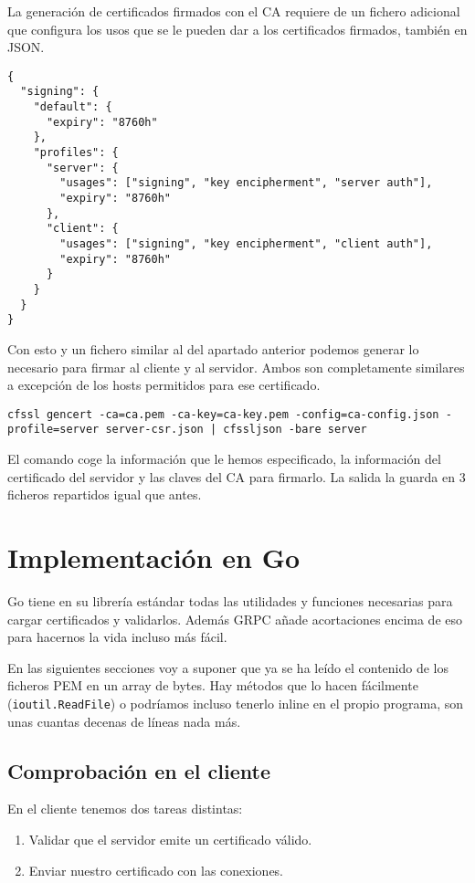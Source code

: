 La generación de certificados firmados con el CA requiere de un fichero adicional que configura los usos que se le pueden dar a los certificados firmados, también en JSON.

\begin{verbatim}
{
  "signing": {
    "default": {
      "expiry": "8760h"
    },
    "profiles": {
      "server": {
        "usages": ["signing", "key encipherment", "server auth"],
        "expiry": "8760h"
      },
      "client": {
        "usages": ["signing", "key encipherment", "client auth"],
        "expiry": "8760h"
      }
    }
  }
}
\end{verbatim}

Con esto y un fichero similar al del apartado anterior podemos generar lo necesario para firmar al cliente y al servidor. Ambos son completamente similares a excepción de los hosts permitidos para ese certificado.

\texttt{cfssl gencert -ca=ca.pem -ca-key=ca-key.pem -config=ca-config.json -profile=server server-csr.json | cfssljson -bare server}

El comando coge la información que le hemos especificado, la información del certificado del servidor y las claves del CA para firmarlo. La salida la guarda en 3 ficheros repartidos igual que antes.

\section{Implementación en Go}

Go tiene en su librería estándar todas las utilidades y funciones necesarias para cargar certificados y validarlos. Además GRPC añade acortaciones encima de eso para hacernos la vida incluso más fácil.

En las siguientes secciones voy a suponer que ya se ha leído el contenido de los ficheros PEM en un array de bytes. Hay métodos que lo hacen fácilmente (\texttt{ioutil.ReadFile}) o podríamos incluso tenerlo inline en el propio programa, son unas cuantas decenas de líneas nada más.

\subsection{Comprobación en el cliente}

En el cliente tenemos dos tareas distintas:
\begin{enumerate}
    \item Validar que el servidor emite un certificado válido.
    \item Enviar nuestro certificado con las conexiones.
\end{enumerate}

